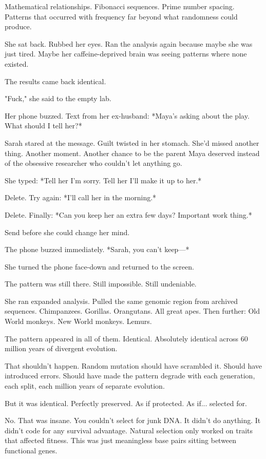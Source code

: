 Mathematical relationships. Fibonacci sequences. Prime number spacing. Patterns that occurred with frequency far beyond what randomness could produce.

She sat back. Rubbed her eyes. Ran the analysis again because maybe she was just tired. Maybe her caffeine-deprived brain was seeing patterns where none existed.

The results came back identical.

"Fuck," she said to the empty lab.

Her phone buzzed. Text from her ex-husband: *Maya's asking about the play. What should I tell her?*

Sarah stared at the message. Guilt twisted in her stomach. She'd missed another thing. Another moment. Another chance to be the parent Maya deserved instead of the obsessive researcher who couldn't let anything go.

She typed: *Tell her I'm sorry. Tell her I'll make it up to her.*

Delete. Try again: *I'll call her in the morning.*

Delete. Finally: *Can you keep her an extra few days? Important work thing.*

Send before she could change her mind.

The phone buzzed immediately. *Sarah, you can't keep—*

She turned the phone face-down and returned to the screen.

The pattern was still there. Still impossible. Still undeniable.

\scenebreak

She ran expanded analysis. Pulled the same genomic region from archived sequences. Chimpanzees. Gorillas. Orangutans. All great apes. Then further: Old World monkeys. New World monkeys. Lemurs.

The pattern appeared in all of them. Identical. Absolutely identical across 60 million years of divergent evolution.

That shouldn't happen. Random mutation should have scrambled it. Should have introduced errors. Should have made the pattern degrade with each generation, each split, each million years of separate evolution.

But it was identical. Perfectly preserved. As if protected. As if... selected for.

No. That was insane. You couldn't select for junk DNA. It didn't do anything. It didn't code for any survival advantage. Natural selection only worked on traits that affected fitness. This was just meaningless base pairs sitting between functional genes.

